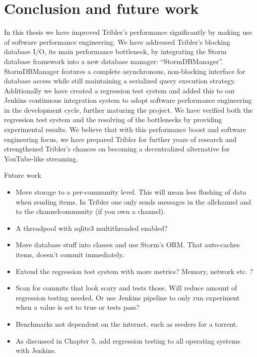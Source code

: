 \chapter{Conclusion and future work}
\label{cpt:conclusion_and_future_work}

In this thesis we have improved Tribler's performance significantly by making use of software performance engineering.
We have addressed Tribler's blocking database I/O, its main performance bottleneck, by integrating the Storm database framework into a new database manager: \enquote{StormDBManager}.
StormDBManager features a complete asynchronous, non-blocking interface for database access while still maintaining a serialized query execution strategy.
Additionally we have created a regression test system and added this to our Jenkins continuous integration system to adopt software performance engineering in the development cycle, further maturing the project.
We have verified both the regression test system and the resolving of the bottlenecks by providing experimental results.
We believe that with this performance boost and software engineering focus, we have prepared Tribler for further years of research and strengthened Tribler's chances on becoming a decentralized alternative for YouTube-like streaming.


Future work

\begin{itemize}
	\item Move storage to a per-community level. This will mean less flushing of data when sending items. In Tribler one only sends messages in the allchannel and to the channelcommunity (if you own a channel).
	\item A threadpool with sqlite3 multithreaded enabled? 
	\item Move database stuff into classes and use Storm's ORM. That auto-caches items, doesn't commit immediately.
	\item Extend the regression test system with more metrics? Memory, network etc. ?
	\item Scan for commits that look scary \cite{huang2014performance} and tests those. Will reduce amount of regression testing needed. Or use Jenkins pipeline to only run experiment when a value is set to true or tests pass?
	\item Benchmarks not dependent on the internet, such as seeders for a torrent.
	\item As discussed in Chapter 5, add regression testing to all operating systems with Jenkins.
\end{itemize}